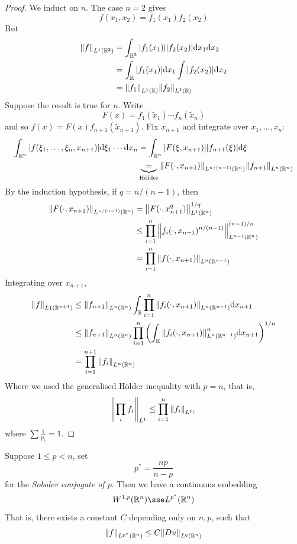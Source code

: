 \documentclass{article}
\begin{document}
\begin{proof}
    We induct on \(n\). The case \(n = 2\) gives
    \[f(x_1, x_2) = f_1(x_1)f_2(x_2)\]
    But
    \begin{align*}
        \norm{f}_{L^1(\mathbb{R}^2)} &= \int_{\mathbb{R}^2}\abs{f_1(x_1)}\abs{f_2(x_2)}\dd x_1 \dd x_2 \\
        &= \int_{\mathbb{R}} \abs{f_1(x_1)}\dd x_1 \int \abs{f_2(x_2)}\dd x_2 \\
        &= \norm{f_1}_{L^1(\mathbb{R})}\norm{f_2}_{L^1(\mathbb{R})}
    \end{align*}
    Suppose the result is true for \(n\). Write
    \[F(x) = f_1(\widetilde x_1) \cdots f_n (\widetilde x_n)\]
    and so \(f(x) = F(x)f_{n+1}(\tilde x_{n+1})\). Fix \(x_{n+1}\) and integrate over \(x_1, \dots, x_n\):
    \begin{align*}
        \int_{\mathbb{R}^n}\abs{f(\xi_1, \dots, \xi_n, x_{n+1})} \dd \xi_1 \cdots \dd x_n &= \int_{\mathbb{R}^n}\abs{F(\xi, x_{n+1})} \abs{f_{n+1}(\xi)}\dd \xi \\
        &\underbrace{=}_{\text{H\"older}} \norm{F(\cdot, x_{n+1})}_{L^{n/(n-1)}(\mathbb{R}^n)}\norm{f_{n+1}}_{L^n(\mathbb{R}^n)}
    \end{align*}
    By the induction hypothesis, if \(q = n/(n-1)\), then
    \begin{align*}
        \norm{F(\cdot, x_{n+1})}_{L^{n/(n-1)}(\mathbb{R}^n)} &= \norm{F(\cdot, x_{n+1}^q)}^{1/q}_{L^1(\mathbb{R}^n)} \\
        &\le \prod_{i=1}^n \norm{f_i(\cdot, x_{n+1})^{n/(n-1)}}^{(n-1)/n}_{L^{n-1}(\mathbb{R}^n)} \\
        &= \prod_{i=1}^n \norm{f(\cdot, x_{n+1})}_{L^n(\mathbb{R}^{n-1})}
    \end{align*}
    Integrating over \(x_{n+1}\),
    \begin{align*}
        \norm{f}_{L1(\mathbb{R}^{n+1})} &\le \norm{f_{n+1}}_{L^n(\mathbb{R}^n)}\int_{\mathbb{R}} \prod_{i=1}^n \norm{f_i(\cdot, x_{n+1})}_{L^n(\mathbb{R}^{n-1})}\dd x_{n+1} \\
        &\le \norm{f_{n+1}}_{L^n(\mathbb{R}^n)}\prod_{i=1}^n\left(\int_{\mathbb{R}} \norm{f_i(\cdot, x_{n+1})}_{L^n(\mathbb{R}^{n-1})}^n \dd x_{n+1}\right)^{1/n} \\
        &= \prod_{i=1}^{n+1}\norm{f_i}_{L^n(\mathbb{R}^n)}
    \end{align*}
    Where we used the generalised H\"older inequality with \(p = n\), that is,
    \[\norm{\prod_i f_i}_{L^1} \le \prod_{i=1}^n \norm{f_i}_{L^{p_i}}\]
    where \(\sum \frac{1}{p_i} = 1\).
\end{proof}

\begin{theorem}
    \label{thm:Gagliado-Nirenberg-Sobolev}
    Suppose \(1\le p < n\), set
    \[p^* = \frac{np}{n-p}\]
    for the \emph{Sobolev conjugate of \(p\)}. Then we have a continuous embedding
    \[W^{1, p}(\R^n) \sse L^{p^*}(\R^n)\]
    That is, there exists a constant \(C\) depending only on \(n, p\), such that
    \begin{equation}
        \label{eq:gns}
        \norm{f}_{L^{p^*}(\mathbb{R}^n)} \le C\norm{D u}_{L^q(\mathbb{R}^n)}
    \end{equation}
\end{theorem}
\end{document}
